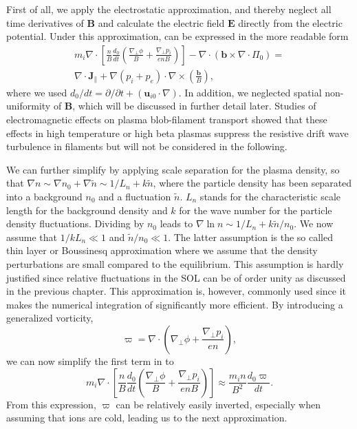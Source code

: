 First of all, we apply the {electrostatic} approximation, and thereby neglect all time derivatives of $\textbf{B}$ and calculate the electric field $\textbf{E}$ directly from the electric potential. Under this approximation,  can be expressed in the more readable form
\begin{multline}\label{electrostatic}
	m_{i}\nabla\cdot\left[\frac{n}{B} \frac{d_0}{dt}\left(\frac{\nabla_\perp\phi}{B} + \frac{\nabla_\perp p_i}{enB}\right) \right] - \nabla\cdot \left(\textbf{b}\times \nabla\cdot \Pi_0\right) = 
	\\ \nabla\cdot\textbf{J}_\parallel + \nabla\left(p_i + p_e\right)\cdot \nabla\times \left(\frac{\textbf{b}}{B}\right),
\end{multline}
where we used $d_0/dt = \partial/\partial t + (\textbf{u}_{i0}\cdot \nabla)$. In addition, we neglected spatial non-uniformity of $\textbf{B}$, which will be discussed in further detail later. Studies of electromagnetic effects on plasma blob-filament transport showed that these effects in high temperature or high beta plasmas suppress the resistive drift wave turbulence in filaments \cite{lee2015electromagnetic,hoare2019dynamics} but will not be considered in the following. 

We can further simplify  by applying scale separation for the plasma density, so that $\nabla n \sim \nabla n_0 + \nabla \widetilde{n} \sim 1/L_n + k \widetilde{n}$, where the particle density has been separated into a background $n_0$ and a fluctuation $\widetilde{n}$. $L_n$ stands for the characteristic scale length for the background density and $k$ for the wave number for the particle density fluctuations. Dividing by $n_0$ leads to $\nabla \ln{n} \sim 1/L_n + k \widetilde{n}/n_0$. We now assume that $1/kL_n \ll 1$ and $\widetilde{n}/n_0 \ll 1$. The latter assumption is the so called {thin layer} or {Boussinesq} approximation where we assume that the density perturbations are small compared to the equilibrium. This assumption is hardly justified since relative fluctuations in the SOL can be of order unity as discussed in the previous chapter. This approximation is, however, commonly used since it makes the numerical integration of  significantly more efficient. By introducing a generalized vorticity,
\begin{equation}
	\varpi = \nabla\cdot\left(\nabla_\perp \phi + \frac{\nabla_\perp p_i}{en}\right),
\end{equation}
we can now simplify the first term in  to
\begin{equation}
	m_{i}\nabla\cdot\left[\frac{n}{B} \frac{d_0}{dt}\left(\frac{\nabla_\perp\phi}{B} + \frac{\nabla_\perp p_i}{enB}\right) \right] \approx \frac{m_i n}{B^2}\frac{d_0\varpi}{dt}.
\end{equation}
From this expression, $\varpi$ can be relatively easily inverted, especially when assuming that ions are cold, leading us to the next approximation. 


